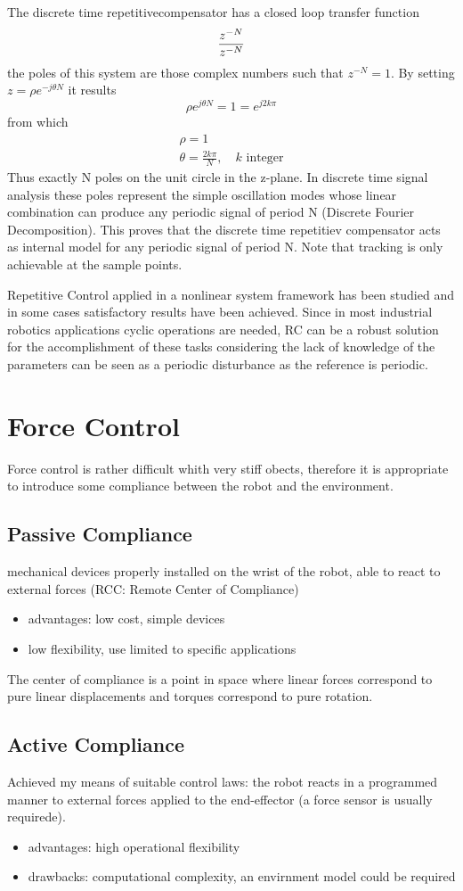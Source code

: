 \documentclass{book}
\begin{document}
The discrete time repetitivecompensator has a closed loop transfer function 
\[
    \displaystyle\frac{z^{-N}}{\-z^{-N}}
\]
the poles of this system are those complex numbers such that $z^{-N}=1$. By setting $z=\rho e^{-j\theta N}$ it results 
\[
    \rho e^{j\theta N} = 1 = e^{j2k\pi}
\]
from which 
\begin{align*}
    \rho = 1 \\
    \theta = \displaystyle\frac{2k\pi}{N}, \quad k \text{ integer}
\end{align*}
Thus exactly N poles on the unit circle in the z-plane. In discrete time signal analysis these poles represent the simple oscillation modes whose linear combination can produce any periodic signal of period N (Discrete Fourier Decomposition). This proves that the discrete time repetitiev compensator acts as internal model for any periodic signal of period N. 
Note that tracking is only achievable at the sample points. 

Repetitive Control applied in a nonlinear system framework has been studied and in some cases satisfactory results have been achieved. Since in most industrial robotics applications cyclic operations are needed, RC can be a robust solution for the accomplishment of these tasks considering the lack of knowledge of the parameters can be seen as a periodic disturbance as the reference is periodic. 


\chapter{Force Control}
Force control is rather difficult whith very stiff obects, therefore it is appropriate to introduce some compliance between the robot and the environment. 
\section{Passive Compliance}
mechanical devices properly installed on the wrist of the robot, able to react to external forces (RCC: Remote Center of Compliance)
\begin{itemize}
    \item advantages: low cost, simple devices
    \item low flexibility, use limited to specific applications
\end{itemize}
The center of compliance is a point in space where linear forces correspond to pure linear displacements and torques correspond to pure rotation.


\section{Active Compliance}
Achieved my means of suitable control laws: the robot reacts in a programmed manner to external forces applied to the end-effector (a force sensor is usually requirede). 
\begin{itemize}
    \item advantages: high operational flexibility
    \item drawbacks: computational complexity, an envirnment model could be required
\end{itemize}
\end{document}
